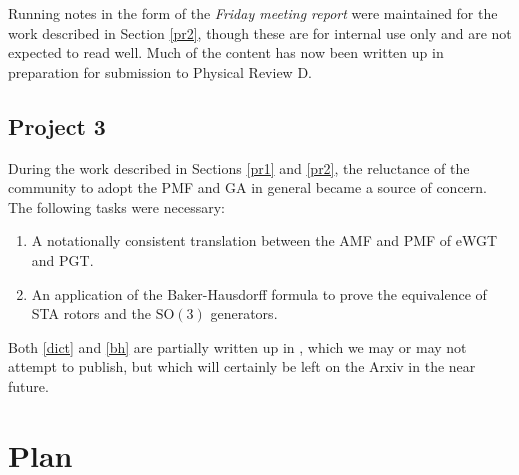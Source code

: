 \documentclass[twoside]{report}
\begin{document}
\begin{multicols}{2}
Running notes in the form of the \textit{Friday meeting report} \cite{fmr} were maintained for the work described in Section \ref{pr2}, though these are for internal use only and are not expected to read well. Much of the content has now been written up \cite{paper-2} in preparation for submission to Physical Review D.
\subsection{Project 3}\label{pr3}
During the work described in Sections \ref{pr1} and \ref{pr2}, the reluctance of the community to adopt the PMF and GA in general became a source of concern. The following tasks were necessary:
\begin{enumerate}[resume]
  \item\label{dict} A notationally consistent translation between the AMF and PMF of eWGT and PGT.
  \item\label{bh} An application of the Baker-Hausdorff formula to prove the equivalence of STA rotors and the $\mathrm{SO}(3)$ generators.
\end{enumerate}
Both \ref{dict} and \ref{bh} are partially written up in \cite{dictionary}, which we may or may not attempt to publish, but which will certainly be left on the Arxiv in the near future.
\section{Plan}\label{plan}
\end{multicols}
\begin{multicols}{2}
%


\end{multicols}
\end{document}
